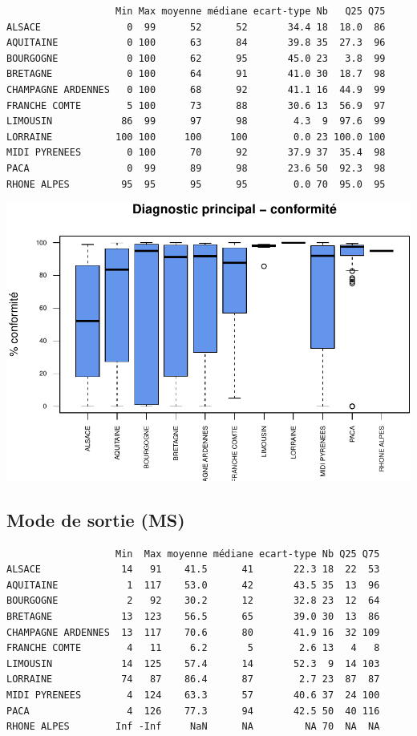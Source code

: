 \documentclass[]{article}
\begin{document}
\begin{verbatim}
                   Min Max moyenne médiane ecart-type Nb   Q25 Q75
ALSACE               0  99      52      52       34.4 18  18.0  86
AQUITAINE            0 100      63      84       39.8 35  27.3  96
BOURGOGNE            0 100      62      95       45.0 23   3.8  99
BRETAGNE             0 100      64      91       41.0 30  18.7  98
CHAMPAGNE ARDENNES   0 100      68      92       41.1 16  44.9  99
FRANCHE COMTE        5 100      73      88       30.6 13  56.9  97
LIMOUSIN            86  99      97      98        4.3  9  97.6  99
LORRAINE           100 100     100     100        0.0 23 100.0 100
MIDI PYRENEES        0 100      70      92       37.9 37  35.4  98
PACA                 0  99      89      98       23.6 50  92.3  98
RHONE ALPES         95  95      95      95        0.0 70  95.0  95
\end{verbatim}

\includegraphics{septembre2015_files/figure-latex/unnamed-chunk-30-1.pdf}

\subsection{Mode de sortie (MS)}\label{mode-de-sortie-ms-1}

\begin{verbatim}
                   Min  Max moyenne médiane ecart-type Nb Q25 Q75
ALSACE              14   91    41.5      41       22.3 18  22  53
AQUITAINE            1  117    53.0      42       43.5 35  13  96
BOURGOGNE            2   92    30.2      12       32.8 23  12  64
BRETAGNE            13  123    56.5      65       39.0 30  13  86
CHAMPAGNE ARDENNES  13  117    70.6      80       41.9 16  32 109
FRANCHE COMTE        4   11     6.2       5        2.6 13   4   8
LIMOUSIN            14  125    57.4      14       52.3  9  14 103
LORRAINE            74   87    86.4      87        2.7 23  87  87
MIDI PYRENEES        4  124    63.3      57       40.6 37  24 100
PACA                 4  126    77.3      94       42.5 50  40 116
RHONE ALPES        Inf -Inf     NaN      NA         NA 70  NA  NA
\end{verbatim}
\end{document}
